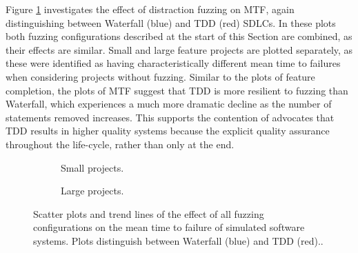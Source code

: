 \documentclass{llncs}
\begin{document}
Figure \ref{fig:fuzzing-mtf} investigates the effect of distraction fuzzing on MTF, again distinguishing between
Waterfall (blue) and TDD (red) SDLCs.  In these plots both fuzzing configurations described at the start of this Section
are combined, as their effects are similar.  Small and large feature projects are plotted separately, as these were
identified as having characteristically different mean time to failures when considering projects without fuzzing.
Similar to the plots of feature completion, the plots of MTF suggest that TDD is more resilient to fuzzing than
Waterfall, which experiences a much more dramatic decline as the number of statements removed increases.  This supports
the contention of advocates that TDD results in higher quality systems because the explicit quality assurance throughout
the life-cycle, rather than only at the end.


\begin{figure}[t]
  \centering
  \begin{subfigure}{2.3in}
    \caption{Small projects.}
  \end{subfigure}
  \hfill
  \begin{subfigure}{2.3in}
    \caption{Large projects.}  
  \end{subfigure}
  
  \caption{Scatter plots and trend lines of the effect of all fuzzing configurations on the mean time to failure of
    simulated software systems.  Plots distinguish between Waterfall (blue) and TDD (red)..}
  \label{fig:fuzzing-mtf}
\end{figure}
 
\end{document}
